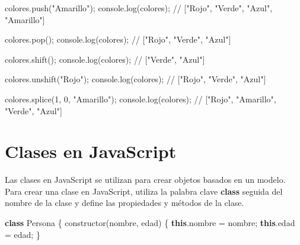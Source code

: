 \documentclass[
  a4paper,
  DIV=11,
  numbers=noendperiod,
  onepage,
  openany]{scrreprt}
\newenvironment{Shaded}{\begin{snugshade}}{\end{snugshade}}
\newcommand{\AttributeTok}[1]{\textcolor[rgb]{0.40,0.45,0.13}{#1}}
\newcommand{\BuiltInTok}[1]{\textcolor[rgb]{0.00,0.23,0.31}{#1}}
\newcommand{\CommentTok}[1]{\textcolor[rgb]{0.37,0.37,0.37}{#1}}
\newcommand{\DecValTok}[1]{\textcolor[rgb]{0.68,0.00,0.00}{#1}}
\newcommand{\FunctionTok}[1]{\textcolor[rgb]{0.28,0.35,0.67}{#1}}
\newcommand{\KeywordTok}[1]{\textcolor[rgb]{0.00,0.23,0.31}{\textbf{#1}}}
\newcommand{\NormalTok}[1]{\textcolor[rgb]{0.00,0.23,0.31}{#1}}
\newcommand{\OperatorTok}[1]{\textcolor[rgb]{0.37,0.37,0.37}{#1}}
\newcommand{\StringTok}[1]{\textcolor[rgb]{0.13,0.47,0.30}{#1}}
\begin{document}
\begin{tcolorbox}
\begin{Shaded}
\begin{Highlighting}[]
\NormalTok{colores}\OperatorTok{.}\FunctionTok{push}\NormalTok{(}\StringTok{"Amarillo"}\NormalTok{)}\OperatorTok{;}
\BuiltInTok{console}\OperatorTok{.}\FunctionTok{log}\NormalTok{(colores)}\OperatorTok{;} \CommentTok{// ["Rojo", "Verde", "Azul", "Amarillo"]}

\NormalTok{colores}\OperatorTok{.}\FunctionTok{pop}\NormalTok{()}\OperatorTok{;}
\BuiltInTok{console}\OperatorTok{.}\FunctionTok{log}\NormalTok{(colores)}\OperatorTok{;} \CommentTok{// ["Rojo", "Verde", "Azul"]}

\NormalTok{colores}\OperatorTok{.}\FunctionTok{shift}\NormalTok{()}\OperatorTok{;}
\BuiltInTok{console}\OperatorTok{.}\FunctionTok{log}\NormalTok{(colores)}\OperatorTok{;} \CommentTok{// ["Verde", "Azul"]}

\NormalTok{colores}\OperatorTok{.}\FunctionTok{unshift}\NormalTok{(}\StringTok{"Rojo"}\NormalTok{)}\OperatorTok{;}
\BuiltInTok{console}\OperatorTok{.}\FunctionTok{log}\NormalTok{(colores)}\OperatorTok{;} \CommentTok{// ["Rojo", "Verde", "Azul"]}

\NormalTok{colores}\OperatorTok{.}\FunctionTok{splice}\NormalTok{(}\DecValTok{1}\OperatorTok{,} \DecValTok{0}\OperatorTok{,} \StringTok{"Amarillo"}\NormalTok{)}\OperatorTok{;}
\BuiltInTok{console}\OperatorTok{.}\FunctionTok{log}\NormalTok{(colores)}\OperatorTok{;} \CommentTok{// ["Rojo", "Amarillo", "Verde", "Azul"]}
\end{Highlighting}
\end{Shaded}

\section{Clases en JavaScript}\label{clases-en-javascript}

Las clases en JavaScript se utilizan para crear objetos basados en un
modelo. Para crear una clase en JavaScript, utiliza la palabra clave
\textbf{class} seguida del nombre de la clase y define las propiedades y
métodos de la clase.

\begin{Shaded}
\begin{Highlighting}[]
\KeywordTok{class}\NormalTok{ Persona \{}
    \FunctionTok{constructor}\NormalTok{(nombre}\OperatorTok{,}\NormalTok{ edad) \{}
        \KeywordTok{this}\OperatorTok{.}\AttributeTok{nombre} \OperatorTok{=}\NormalTok{ nombre}\OperatorTok{;}
        \KeywordTok{this}\OperatorTok{.}\AttributeTok{edad} \OperatorTok{=}\NormalTok{ edad}\OperatorTok{;}
\NormalTok{    \}}


\end{Highlighting}
\end{Shaded}
\end{tcolorbox}
\end{document}

